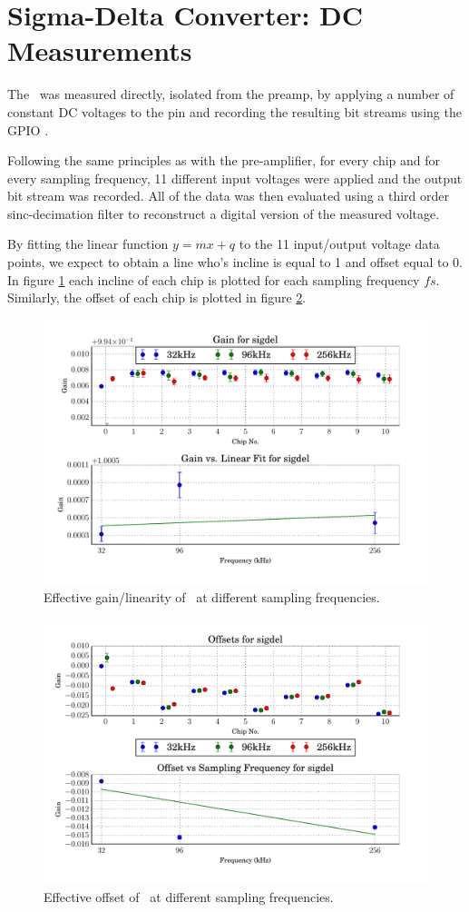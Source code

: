 \section{Sigma-Delta Converter: DC Measurements}
\label{sec:sigdelDC}

The \sdm~was measured directly, isolated from the preamp, by applying a number
of  constant  DC  voltages  to  the  pin  and  recording  the
resulting bit streams using the GPIO \raspi.

Following  the  same  principles as with the pre-amplifier, for every chip and
for every sampling frequency, 11 different input voltages were applied and the
output bit  stream  was  recorded.  All of the data was then evaluated using a
third order sinc-decimation filter to reconstruct a  digital  version  of  the
measured voltage.

By fitting the linear function $y=mx+q$ to  the  11  input/output voltage data
points, we expect to obtain a  line  who's  incline  is  equal to 1 and offset
equal to 0. In figure \ref{fig:sigdel_gain}  each  incline  of  each  chip  is
plotted for  each  sampling frequency $fs$. Similarly, the offset of each chip
is plotted in figure \ref{fig:sigdel_offset}.

\begin{figure}
    \centering
    \includegraphics[width=.7\linewidth]{images/plots/dc_slope_for_sigdel.pdf}
    \caption{Effective gain/linearity of \sdm~at different sampling frequencies.}
    \label{fig:sigdel_gain}
\end{figure}
\begin{figure}
    \centering
    \includegraphics[width=.7\linewidth]{images/plots/dc_offsets_sigdel.pdf}
    \caption{Effective offset of \sdm~at different sampling frequencies.}
    \label{fig:sigdel_offset}
\end{figure}


